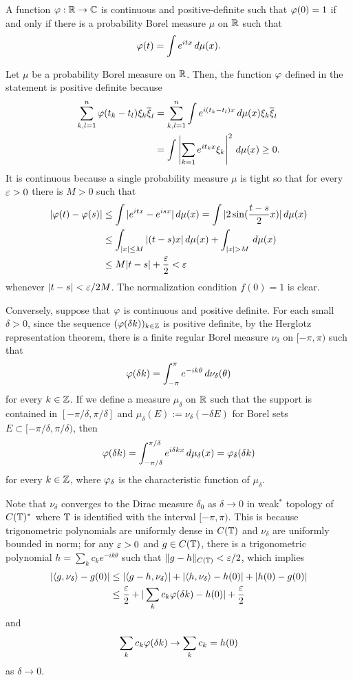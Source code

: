 \documentclass{../../small}
\begin{document}
\begin{cor}
A function $\varphi:\mathbb{R}\to\mathbb{C}$ is continuous and positive-definite such that $\varphi(0)=1$ if and only if there is a probability Borel measure $\mu$ on $\mathbb{R}$ such that
\[\varphi(t)=\int e^{itx}\,d\mu(x).\]
\end{cor}
\begin{pf}
Let $\mu$ be a probability Borel measure on $\mathbb{R}$.
Then, the function $\varphi$ defined in the statement is positive definite because
\begin{align*}
\sum_{k,l=1}^n\varphi(t_k-t_l)\xi_k\overline\xi_l
&=\sum_{k,l=1}^n\int e^{i(t_k-t_l)x}\,d\mu(x)\xi_k\overline\xi_l\\
&=\int\left|\sum_{k=1}e^{it_kx}\xi_k\right|^2\,d\mu(x)\ge0.
\end{align*}
It is continuous because a single probability measure $\mu$ is tight so that for every $\varepsilon>0$ there is $M>0$ such that
\begin{align*}
|\f(t)-\f(s)|&\le\int|e^{itx}-e^{isx}|\,d\mu(x)
=\int|2\sin(\frac{t-s}2x)|\,d\mu(x)\\
&\le\int_{|x|\le M}|(t-s)x|\,d\mu(x)+\int_{|x|>M}\,d\mu(x)\\
&\le M|t-s|+\frac\e2<\e
\end{align*}
whenever $|t-s|<\varepsilon/2M$.
The normalization condition $f(0)=1$ is clear.

Conversely, suppose that $\varphi$ is continuous and positive definite.
For each small $\delta>0$, since the sequence $(\varphi(\delta k))_{k\in\mathbb{Z}}$ is positive definite, by the Herglotz representation theorem, there is a finite regular Borel measure $\nu_\delta$ on $[-\pi,\pi)$ such that
\[\varphi(\delta k)=\int_{-\pi}^\pi e^{-ik\theta}\,d\nu_\delta(\theta)\]
for every $k\in\mathbb{Z}$.
If we define a measure $\mu_\delta$ on $\mathbb{R}$ such that the support is contained in $[-\pi/\delta,\pi/\delta]$ and $\mu_\delta(E):=\nu_\delta(-\delta E)$ for Borel sets $E\subset[-\pi/\delta,\pi/\delta)$, then
\[\varphi(\delta k)=\int_{-\pi/\delta}^{\pi/\delta}e^{i\delta kx}\,d\mu_\delta(x)=\varphi_\delta(\delta k)\]
for every $k\in\mathbb{Z}$, where $\varphi_\delta$ is the characteristic function of $\mu_\delta$.

Note that $\nu_\delta$ converges to the Dirac measure $\delta_0$ as $\delta\to0$ in weak$^*$ topology of $C(\mathbb{T})^*$ where $\mathbb{T}$ is identified with the interval $[-\pi,\pi)$.
This is because trigonometric polynomials are uniformly dense in $C(\mathbb{T})$ and $\nu_\delta$ are uniformly bounded in norm; for any $\varepsilon>0$ and $g\in C(\mathbb{T})$, there is a trigonometric polynomial $h=\sum_kc_ke^{-ik\theta}$ such that $\|g-h\|_{C(\mathbb{T})}<\varepsilon/2$, which implies
\begin{align*}
|\langle g,\nu_\delta\rangle-g(0)|
&\le|\langle g-h,\nu_\delta\rangle|+|\langle h,\nu_\delta\rangle-h(0)|+|h(0)-g(0)|\\
&\le\frac{\varepsilon}2+|\sum_kc_k\varphi(\delta k)-h(0)|+\frac{\varepsilon}2
\end{align*}
and
\[\sum_kc_k\varphi(\delta k)\to\sum_kc_k=h(0)\]
as $\delta\to0$.


\end{pf}
\end{document}
